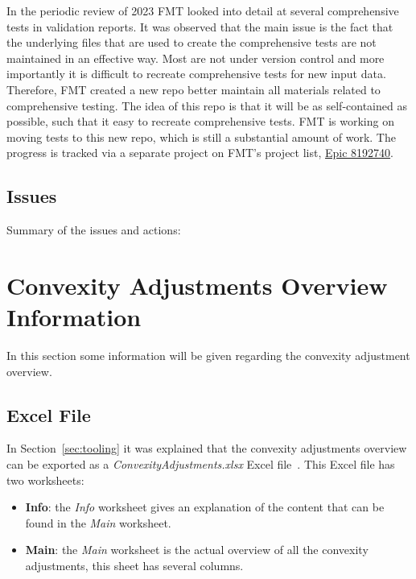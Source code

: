\documentclass[reviewdoc]{pmv_report} %
\begin{document}
In the periodic review of 2023 FMT looked into detail at several comprehensive tests in validation reports.
It was observed that the main issue is the fact that the underlying files that are used to create the comprehensive tests are not maintained in an effective way.
Most are not under version control and more importantly it is difficult to recreate comprehensive tests for new input data.
Therefore, FMT created a new repo better maintain all materials related to comprehensive testing.
The idea of this repo is that it will be as self-contained as possible, such that it easy to recreate comprehensive tests.
FMT is working on moving tests to this new repo, which is still a substantial amount of work.
The progress is tracked via a separate project on FMT's project list, \href{https://dev.azure.com/raboweb/PMVProjectList/_workitems/edit/8192740}{Epic 8192740}.

\subsection{Issues}
Summary of the issues and actions:
\begin{itemize}
  \issueactionIII
\end{itemize}

\section{Convexity Adjustments Overview Information}
\label{sec:overview}
In this section some information will be given regarding the convexity adjustment overview.

\subsection{Excel File}
\label{sec:excelFile}
In Section~\ref{sec:tooling} it was explained that the convexity adjustments overview can be exported as a \textit{ConvexityAdjustments.xlsx} Excel file~\cite{ConvexityAdjustmentsWb}.
This Excel file has two worksheets:
\begin{itemize}
  \item \textbf{Info}: the \textit{Info} worksheet gives an explanation of the content that can be found in the \textit{Main} worksheet.
  \item \textbf{Main}: the \textit{Main} worksheet is the actual overview of all the convexity adjustments, this sheet has several columns.
\end{itemize}
\end{document}
